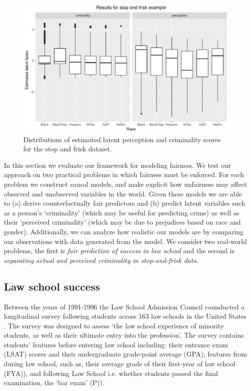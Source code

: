 \begin{figure}[!th]
\begin{center}
\vspace{-1ex}
\centerline{\includegraphics[width=\columnwidth]{stopandfrisk_output.pdf}}
\vspace{-2ex}
\caption{Distributions of estimated latent perception and criminality scores for the stop and frisk dataset.\label{figure.stop_and_frisk_output}}
\vspace{-2ex}
\end{center}
\end{figure}

In this section we evaluate our framework for modeling fairness. We test our approach on two practical problems in which fairness must be enforced. For each problem we construct causal models, and make explicit how unfairness may affect observed and unobserved variables in the world. Given these models we are able to (a) derive counterfactually fair predictors and (b) predict latent variables such as a person's `criminality' (which may be useful for predicting crime) as well as their `perceived criminality' (which may be due to prejudices based on race and gender). Additionally, we can analyze how realistic our models are by comparing our observations with data generated from the model. We consider two real-world problems, the first is \emph{fair prediction of success in law school} and the second is \emph{separating actual and perceived criminality in stop-and-frisk data}.

\subsection{Law school success}
Between the years of 1991-1996 the Law School Admission Council
counducted a longitudinal survey following students across 163 law
schools in the United States \cite{wightman1998lsac}. The survey was
designed to assess `the law school experience of minority students, as
well as their ultimate entry into the profession'. The survey contains
students' features before entering law school including: their
entrance exam (LSAT) scores and their undergraduate grade-point
average (GPA); features from during law school, such as, their average
grade of their first-year of law school (FYA)), and following Law
School i.e. whether students passed the final examination, the `bar
exam' (P)).

